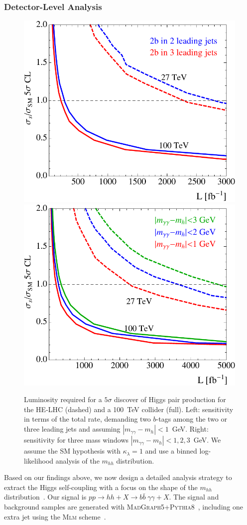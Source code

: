 \subsubsection{Detector-Level Analysis}
\label{sec:features}

\begin{figure}[b!]
\centering 
 \includegraphics[width=.4\textwidth]{section3/plots/hh_5sigma_2b3j} 
 \includegraphics[width=.4\textwidth]{section3/plots/hh_5sigma_width}
   \caption{Luminosity required for a $5\sigma$ discover of Higgs pair
     production for the HE-LHC (dashed) and a 100~TeV collider (full).
     Left: sensitivity in terms of the total rate, demanding two
     $b$-tags among the two or three leading jets and assuming
     $|m_{\gamma\gamma}-m_h|<1$~GeV.  Right: sensitivity for three
     mass windows $|m_{\gamma\gamma}-m_h|<1,2,3$~GeV.  We assume the
     SM hypothesis with $\kappa_\lambda=1$ and use a binned
     log-likelihood analysis of the $m_{hh}$ distribution.}
 \label{fig:bound1}
\end{figure}

Based on our findings above, we now design a detailed analysis strategy to extract the Higgs
self-coupling with a focus on the shape of the $m_{hh}$
distribution~\cite{he-lhc-hh}. Our signal is $pp \to hh + X \to b\bar{b} \; \gamma \gamma + X$.
The signal and background samples are generated with
\textsc{MadGraph5}+\textsc{Pythia8}~\cite{mg5,pythia8}, including one
extra jet using the \textsc{Mlm} scheme~\cite{mlm}.\medskip

